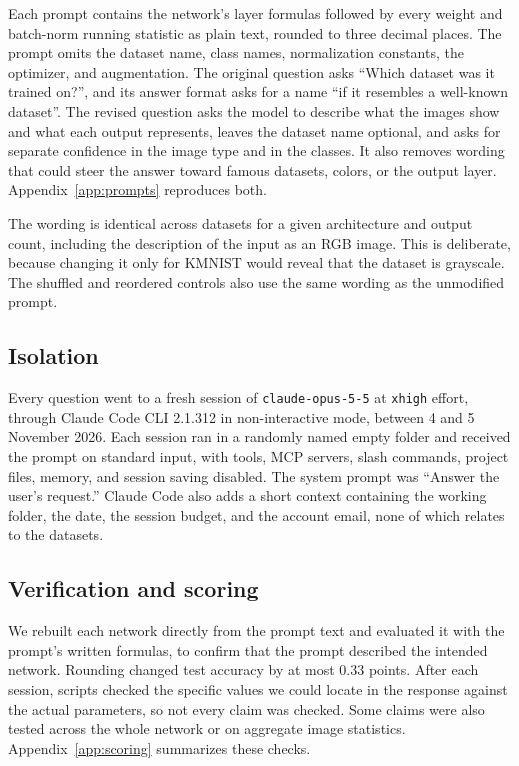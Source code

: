 \documentclass[11pt]{article}
\begin{document}
Each prompt contains the network's layer formulas followed by every weight and batch-norm running statistic as plain text, rounded to three decimal places. The prompt omits the dataset name, class names, normalization constants, the optimizer, and augmentation. The original question asks ``Which dataset was it trained on?'', and its answer format asks for a name ``if it resembles a well-known dataset''. The revised question asks the model to describe what the images show and what each output represents, leaves the dataset name optional, and asks for separate confidence in the image type and in the classes. It also removes wording that could steer the answer toward famous datasets, colors, or the output layer. Appendix~\ref{app:prompts} reproduces both.

The wording is identical across datasets for a given architecture and output count, including the description of the input as an RGB image. This is deliberate, because changing it only for KMNIST would reveal that the dataset is grayscale. The shuffled and reordered controls also use the same wording as the unmodified prompt.

\subsection{Isolation}

Every question went to a fresh session of \texttt{claude-opus-5-5} at \texttt{xhigh} effort, through Claude Code CLI 2.1.312 in non-interactive mode, between 4 and 5 November 2026. Each session ran in a randomly named empty folder and received the prompt on standard input, with tools, MCP servers, slash commands, project files, memory, and session saving disabled. The system prompt was ``Answer the user's request.'' Claude Code also adds a short context containing the working folder, the date, the session budget, and the account email, none of which relates to the datasets.

\subsection{Verification and scoring}

We rebuilt each network directly from the prompt text and evaluated it with the prompt's written formulas, to confirm that the prompt described the intended network. Rounding changed test accuracy by at most 0.33 points. After each session, scripts checked the specific values we could locate in the response against the actual parameters, so not every claim was checked. Some claims were also tested across the whole network or on aggregate image statistics. Appendix~\ref{app:scoring} summarizes these checks.
\end{document}
